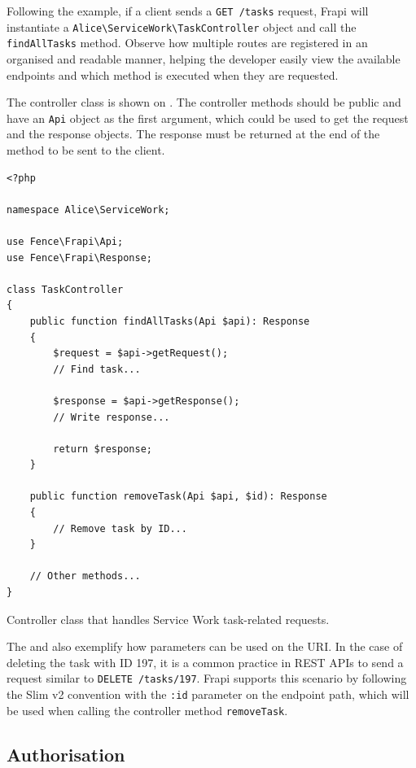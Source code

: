 Following the example, if a client sends a \texttt{GET /tasks} request, Frapi will instantiate a \texttt{Alice\textbackslash ServiceWork\textbackslash TaskController} object and call the \texttt{findAllTasks} method. Observe how multiple routes are registered in an organised and readable manner, helping the developer easily view the available endpoints and which method is executed when they are requested.

The controller class is shown on . The controller methods should be public and have an \texttt{Api} object as the first argument, which could be used to get the request and the response objects. The response must be returned at the end of the method to be sent to the client.

\begin{listing}[htbp]
\begin{verbatim}
<?php

namespace Alice\ServiceWork;

use Fence\Frapi\Api;
use Fence\Frapi\Response;

class TaskController
{
	public function findAllTasks(Api $api): Response
	{
		$request = $api->getRequest();
		// Find task...
		
		$response = $api->getResponse();
		// Write response...

		return $response;
	}

	public function removeTask(Api $api, $id): Response
	{
		// Remove task by ID...
	}

	// Other methods...
}
\end{verbatim}
\caption{Controller class that handles Service Work task-related requests.}
\label{code:controller-endpoint-php}
\end{listing}

The  and  also exemplify how parameters can be used on the URI. In the case of deleting the task with ID 197, it is a common practice in REST APIs to send a request similar to \texttt{DELETE /tasks/197}. Frapi supports this scenario by following the Slim v2 convention \cite{slim-v2-routing-params} with the \texttt{:id} parameter on the endpoint path, which will be used when calling the controller method \texttt{removeTask}.

\subsection{Authorisation}


